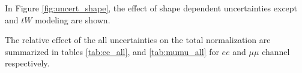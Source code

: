 In Figure \ref{fig:uncert_shape}, the effect of shape dependent uncertainties except \ttbar~ and $tW$ modeling are shown.

The relative effect of the all uncertainties on the total normalization are summarized in tables \ref{tab:ee_all}, and \ref{tab:mumu_all} for $ee$ and $\mu\mu$ channel respectively.

%
%
